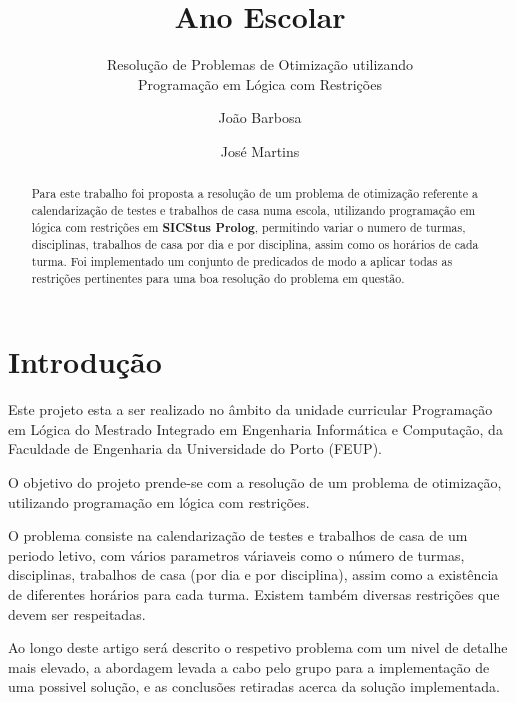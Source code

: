 \documentclass{llncs}
\begin{document}
%
\frontmatter          %
%
\pagestyle{headings}  %
%
\title{Ano Escolar}
\subtitle{Resolução de Problemas de Otimização utilizando\\
Programação em Lógica com Restrições}
%
%
\author{João Barbosa \and José Martins}
%
%

\maketitle              %

\begin{abstract} %

Para este trabalho foi proposta a resolução de um problema de otimização referente a calendarização de testes e trabalhos de casa numa escola, utilizando programação em lógica com restrições em \textbf{SICStus Prolog}, permitindo variar o numero de turmas, disciplinas, trabalhos de casa por dia e por disciplina, assim como os horários de cada turma.
Foi implementado um conjunto de predicados de modo a aplicar todas as restrições pertinentes para uma boa resolução do problema em questão.

\end{abstract}
%
\section{Introdução}
%
Este projeto esta a ser realizado no âmbito da unidade curricular Programação em Lógica do Mestrado Integrado em Engenharia Informática e Computação, da Faculdade de Engenharia da Universidade do Porto (FEUP).\par
O objetivo do projeto prende-se com a resolução de um problema de otimização, utilizando programação em lógica com restrições.\par
O problema consiste na calendarização de testes e trabalhos de casa de um periodo letivo, com vários parametros váriaveis como o número de turmas, disciplinas, trabalhos de casa (por dia e por disciplina), assim como a existência de diferentes horários para cada turma. Existem também diversas restrições que devem ser respeitadas.\par
Ao longo deste artigo será descrito o respetivo problema com um nivel de detalhe mais elevado, a abordagem levada a cabo pelo grupo para a implementação de uma possivel solução, e as conclusões retiradas acerca da solução implementada.
\end{document}

